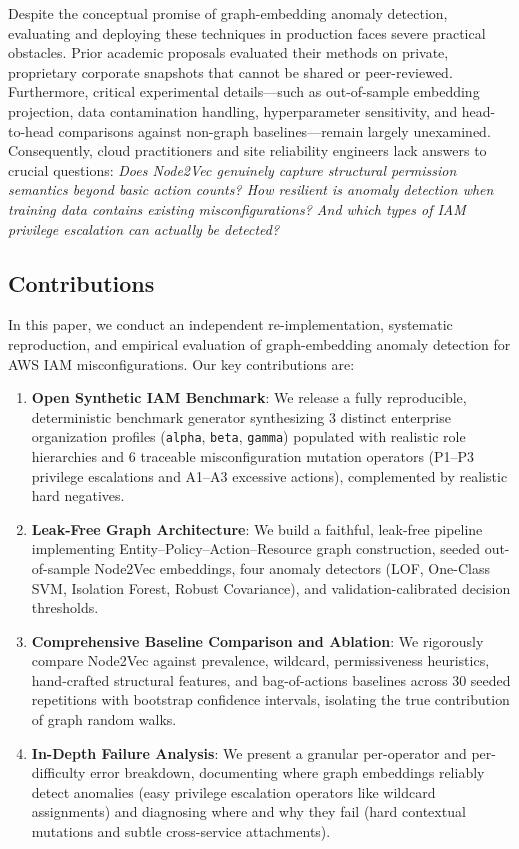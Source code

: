 Despite the conceptual promise of graph-embedding anomaly detection, evaluating and deploying these techniques in production faces severe practical obstacles. Prior academic proposals evaluated their methods on private, proprietary corporate snapshots that cannot be shared or peer-reviewed. Furthermore, critical experimental details---such as out-of-sample embedding projection, data contamination handling, hyperparameter sensitivity, and head-to-head comparisons against non-graph baselines---remain largely unexamined. Consequently, cloud practitioners and site reliability engineers lack answers to crucial questions: \emph{Does Node2Vec genuinely capture structural permission semantics beyond basic action counts? How resilient is anomaly detection when training data contains existing misconfigurations? And which types of IAM privilege escalation can actually be detected?}

\subsection{Contributions}
In this paper, we conduct an independent re-implementation, systematic reproduction, and empirical evaluation of graph-embedding anomaly detection for AWS IAM misconfigurations. Our key contributions are:

\begin{enumerate}
    \item \textbf{Open Synthetic IAM Benchmark}: We release a fully reproducible, deterministic benchmark generator synthesizing 3 distinct enterprise organization profiles (\texttt{alpha}, \texttt{beta}, \texttt{gamma}) populated with realistic role hierarchies and 6 traceable misconfiguration mutation operators (P1--P3 privilege escalations and A1--A3 excessive actions), complemented by realistic hard negatives.
    \item \textbf{Leak-Free Graph Architecture}: We build a faithful, leak-free pipeline implementing Entity--Policy--Action--Resource graph construction, seeded out-of-sample Node2Vec embeddings, four anomaly detectors (LOF, One-Class SVM, Isolation Forest, Robust Covariance), and validation-calibrated decision thresholds.
    \item \textbf{Comprehensive Baseline Comparison and Ablation}: We rigorously compare Node2Vec against prevalence, wildcard, permissiveness heuristics, hand-crafted structural features, and bag-of-actions baselines across 30 seeded repetitions with bootstrap confidence intervals, isolating the true contribution of graph random walks.
    \item \textbf{In-Depth Failure Analysis}: We present a granular per-operator and per-difficulty error breakdown, documenting where graph embeddings reliably detect anomalies (easy privilege escalation operators like wildcard assignments) and diagnosing where and why they fail (hard contextual mutations and subtle cross-service attachments).
\end{enumerate}

